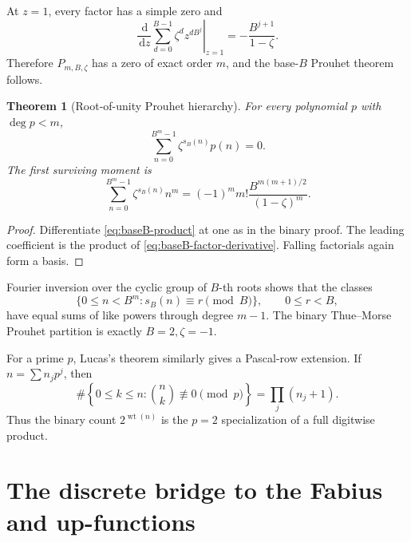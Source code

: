\documentclass[11pt,oneside]{article}
\numberwithin{equation}{section}
\newtheorem{theorem}{Theorem}[section]
\theoremstyle{definition}
\theoremstyle{remark}
\newcommand{\wt}{\operatorname{wt}}
\newcommand{\dd}{\,\mathrm d}
\begin{document}
At \(z=1\), every factor has a simple zero and
\begin{equation}
 \left.\frac{\dd}{\dd z}\sum_{d=0}^{B-1}
 \zeta^dz^{dB^j}\right|_{z=1}
 =-\frac{B^{j+1}}{1-\zeta}.
 \label{eq:baseB-factor-derivative}
\end{equation}
Therefore \(P_{m,B,\zeta}\) has a zero of exact order \(m\), and the
base-\(B\) Prouhet theorem follows.

\begin{theorem}[Root-of-unity Prouhet hierarchy]
For every polynomial \(p\) with \(\deg p<m\),
\begin{equation}
 \boxed{\sum_{n=0}^{B^m-1}\zeta^{s_B(n)}p(n)=0.}
 \label{eq:baseB-Prouhet}
\end{equation}
The first surviving moment is
\begin{equation}
 \boxed{\sum_{n=0}^{B^m-1}\zeta^{s_B(n)}n^m
 =(-1)^m m!\frac{B^{m(m+1)/2}}{(1-\zeta)^m}.}
 \label{eq:baseB-first-moment}
\end{equation}
\end{theorem}

\begin{proof}
Differentiate \eqref{eq:baseB-product} at one as in the binary proof.  The
leading coefficient is the product of
\eqref{eq:baseB-factor-derivative}.  Falling factorials again form a basis.
\end{proof}

Fourier inversion over the cyclic group of \(B\)-th roots shows that the
classes
\begin{equation}
 \{0\le n<B^m:s_B(n)\equiv r\pmod B\},\qquad 0\le r<B,
 \label{eq:baseB-classes}
\end{equation}
have equal sums of like powers through degree \(m-1\).  The binary
Thue--Morse Prouhet partition is exactly \(B=2,\zeta=-1\).

For a prime \(p\), Lucas's theorem similarly gives a Pascal-row extension.  If
\(n=\sum n_jp^j\), then
\begin{equation}
 \#\left\{0\le k\le n:\binom nk\not\equiv0\pmod p\right\}
 =\prod_j(n_j+1).
 \label{eq:Lucas-nonzero-p}
\end{equation}
Thus the binary count \(2^{\wt(n)}\) is the \(p=2\) specialization of a
full digitwise product.

\section{The discrete bridge to the Fabius and up-functions}
\label{sec:fabius}
\end{document}
